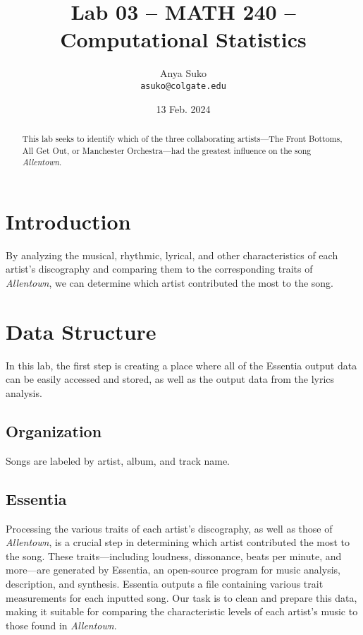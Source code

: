 \documentclass{article}\usepackage[]{graphicx}\usepackage[]{xcolor}
\begin{document}
\vspace{-1in}
\title{Lab 03 -- MATH 240 -- Computational Statistics}

\author{
  Anya Suko \\
  {\tt asuko@colgate.edu}
}

\date{13 Feb. 2024}

\maketitle

\begin{multicols}{2}
\begin{abstract}
This lab seeks to identify which of the three collaborating artists—The Front Bottoms, All Get Out, or Manchester Orchestra—had the greatest influence on the song \emph{Allentown}.
\end{abstract}

\section{Introduction}
By analyzing the musical, rhythmic, lyrical, and other characteristics of each artist’s discography and comparing them to the corresponding traits of \emph{Allentown}, we can determine which artist contributed the most to the song.

\section{Data Structure}
In this lab, the first step is creating a place where all of the Essentia output data can be easily accessed and stored, as well as the output data from the lyrics analysis.

\subsection{Organization}
Songs are labeled by artist, album, and track name.

\subsection{Essentia}
Processing the various traits of each artist’s discography, as well as those of \emph{Allentown}, is a crucial step in determining which artist contributed the most to the song. These traits—including loudness, dissonance, beats per minute, and more—are generated by Essentia, an open-source program for music analysis, description, and synthesis. Essentia outputs a file containing various trait measurements for each inputted song. Our task is to clean and prepare this data, making it suitable for comparing the characteristic levels of each artist’s music to those found in \emph{Allentown}.


\end{multicols}
\end{document}
